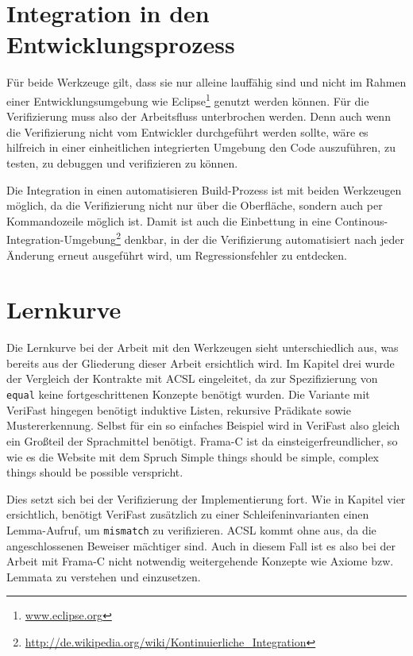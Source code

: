 \section{Integration in den Entwicklungsprozess}

Für beide Werkzeuge gilt, dass sie nur alleine lauffähig sind und nicht im Rahmen
einer Entwicklungsumgebung wie Eclipse\footnote{\url{www.eclipse.org}} genutzt werden können. 
Für die Verifizierung muss also der Arbeitsfluss unterbrochen werden. Denn auch wenn die Verifizierung
nicht vom Entwickler durchgeführt werden sollte, wäre es hilfreich in einer einheitlichen integrierten Umgebung
den Code auszuführen, zu testen, zu debuggen und verifizieren zu können.

Die Integration in einen automatisieren Build-Prozess ist mit beiden Werkzeugen möglich, da die Verifizierung nicht nur
über die Oberfläche, sondern auch per Kommandozeile möglich ist. Damit ist auch die Einbettung in eine
Continous-Integration-Umgebung\footnote{\url{http://de.wikipedia.org/wiki/Kontinuierliche_Integration}} denkbar,
in der die Verifizierung automatisiert nach jeder Änderung erneut ausgeführt wird, um Regressionsfehler zu entdecken.


\section{Lernkurve}

Die Lernkurve bei der Arbeit mit den Werkzeugen sieht unterschiedlich aus, was bereits aus der Gliederung dieser
Arbeit ersichtlich wird. Im Kapitel drei wurde der Vergleich der Kontrakte mit ACSL eingeleitet, da zur
Spezifizierung von \texttt{equal} keine fortgeschrittenen Konzepte benötigt wurden. Die Variante mit VeriFast
hingegen benötigt induktive Listen, rekursive Prädikate sowie Mustererkennung. Selbst für ein so einfaches Beispiel
wird in VeriFast also gleich ein Großteil der Sprachmittel benötigt. Frama-C ist da einsteigerfreundlicher, so
wie es die Website mit dem Spruch \glqq Simple things should be simple, complex things should be possible\grqq{} verspricht.

Dies setzt sich bei der Verifizierung der Implementierung fort. Wie in Kapitel vier ersichtlich, benötigt VeriFast
zusätzlich zu einer Schleifeninvarianten einen Lemma-Aufruf, um \texttt{mismatch} zu verifizieren. ACSL kommt ohne aus,
da die angeschlossenen Beweiser mächtiger sind. Auch in diesem Fall ist es also bei der Arbeit mit Frama-C nicht
notwendig weitergehende Konzepte wie Axiome bzw. Lemmata zu verstehen und einzusetzen.

